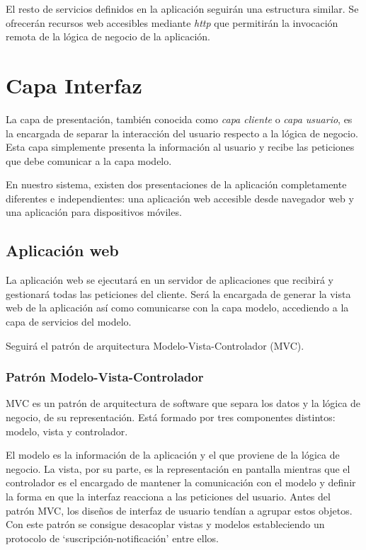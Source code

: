El resto de servicios definidos en la aplicación seguirán una estructura similar. Se ofrecerán recursos web accesibles mediante \textit{http} que permitirán la invocación remota de la lógica de negocio de la aplicación.


\section{Capa Interfaz}
La capa de presentación, también conocida como \textit{capa cliente} o \textit{capa usuario}, es la encargada de separar la interacción del usuario respecto a la lógica de negocio. Esta capa simplemente presenta la información al usuario y recibe las peticiones que debe comunicar a la capa modelo.

En nuestro sistema, existen dos presentaciones de la aplicación completamente diferentes e independientes: una aplicación web accesible desde navegador web y una aplicación para dispositivos móviles.

\subsection{Aplicación web}
La aplicación web se ejecutará en un servidor de aplicaciones que recibirá y gestionará todas las peticiones del cliente. Será la encargada de generar la vista web de la aplicación así como comunicarse con la capa modelo, accediendo a la capa de servicios del modelo.

Seguirá el patrón de arquitectura Modelo-Vista-Controlador (MVC).

\subsubsection*{Patrón Modelo-Vista-Controlador}
MVC es un patrón de arquitectura de software que separa los datos y la lógica de negocio, de su representación. Está formado por tres componentes distintos: modelo, vista y controlador.

El modelo es la información de la aplicación y el que proviene de la lógica de negocio. La vista, por su parte, es la representación en pantalla mientras que el controlador es el encargado de mantener la comunicación con el modelo y definir la forma en que la interfaz reacciona a las peticiones del usuario. Antes del patrón MVC, los diseños de interfaz de usuario tendían a agrupar estos objetos. Con este patrón se consigue desacoplar vistas y modelos estableciendo un protocolo de `suscripción-notificación' entre ellos.

